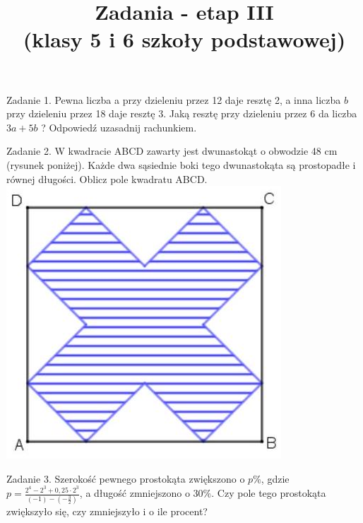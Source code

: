\documentclass[10pt]{article}
\title{Zadania - etap III \\
 (klasy 5 i 6 szkoły podstawowej) }
\author{}
\date{}
\begin{document}
\maketitle
Zadanie 1. Pewna liczba a przy dzieleniu przez 12 daje resztę 2, a inna liczba \(b\) przy dzieleniu przez 18 daje resztę 3. Jaką resztę przy dzieleniu przez 6 da liczba \(3 a+5 b\) ? Odpowiedź uzasadnij rachunkiem.

Zadanie 2. W kwadracie ABCD zawarty jest dwunastokąt o obwodzie 48 cm (rysunek poniżej). Każde dwa sąsiednie boki tego dwunastokąta są prostopadłe i równej długości. Oblicz pole kwadratu ABCD.\\
\includegraphics[max width=\textwidth, center]{2024_11_21_c870d62e3507162d8375g-1}

Zadanie 3. Szerokość pewnego prostokąta zwiększono o \(p \%\), gdzie \(p=\frac{2^{4}-2^{3}+0,25 \cdot 2^{3}}{(-1)-\left(-\frac{3}{2}\right)}\), a długość zmniejszono o \(30 \%\). Czy pole tego prostokąta zwiększyło się, czy zmniejszyło i o ile procent?
\end{document}
